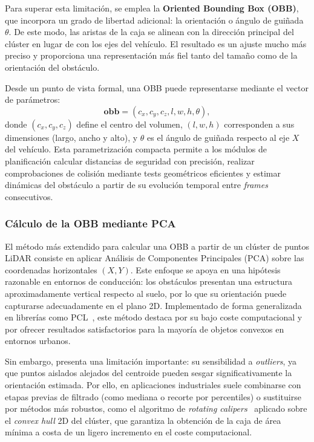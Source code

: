 Para superar esta limitación, se emplea la \textbf{Oriented Bounding
Box (OBB)}, que incorpora un grado de libertad adicional: la
orientación o ángulo de guiñada $\theta$. De este modo, las aristas de
la caja se alinean con la dirección principal del clúster en lugar de
con los ejes del vehículo. El resultado es un ajuste mucho más preciso
y proporciona una representación más fiel tanto del tamaño como de la
orientación del obstáculo.

Desde un punto de vista formal, una OBB puede representarse mediante el
vector de parámetros:
\begin{equation}
    \mathbf{obb} = (c_x, c_y, c_z, l, w, h, \theta),
\end{equation}
donde $(c_x, c_y, c_z)$ define el centro del volumen, $(l, w, h)$
corresponden a sus dimensiones (largo, ancho y alto), y $\theta$ es el
ángulo de guiñada respecto al eje $X$ del vehículo. Esta parametrización
compacta permite a los módulos de planificación calcular distancias de
seguridad con precisión, realizar comprobaciones de colisión mediante
tests geométricos eficientes y estimar dinámicas del obstáculo a partir
de su evolución temporal entre \textit{frames} consecutivos.

\subsubsection{Cálculo de la OBB mediante PCA}
\label{sec:obb-pca}

El método más extendido para calcular una OBB a partir de un clúster de
puntos LiDAR consiste en aplicar Análisis de Componentes Principales
(PCA) sobre las coordenadas horizontales $(X, Y)$. Este enfoque se
apoya en una hipótesis razonable en entornos de conducción: los
obstáculos presentan una estructura aproximadamente vertical respecto
al suelo, por lo que su orientación puede capturarse adecuadamente en
el plano 2D. Implementado de forma generalizada en librerías como
PCL~\cite{rusu2011pcl}, este método destaca por su bajo coste
computacional y por ofrecer resultados satisfactorios para la mayoría
de objetos convexos en entornos urbanos.

Sin embargo, presenta una limitación importante: su sensibilidad a
\textit{outliers}, ya que puntos aislados alejados del centroide pueden
sesgar significativamente la orientación estimada. Por ello, en
aplicaciones industriales suele combinarse con etapas previas de
filtrado (como mediana o recorte por percentiles) o sustituirse por
métodos más robustos, como el algoritmo de \textit{rotating
calipers}~\cite{toussaint_calipers} aplicado sobre el \textit{convex
hull} 2D del clúster, que garantiza la obtención de la caja de área
mínima a costa de un ligero incremento en el coste computacional.

